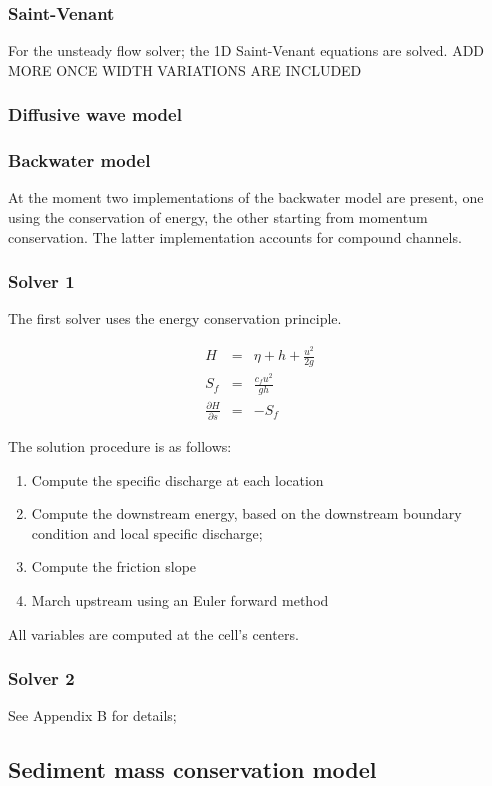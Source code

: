 \documentclass[a4paper, 11pt]{article}
\begin{document}
\subsubsection{Saint-Venant}
For the unsteady flow solver; the 1D Saint-Venant equations are solved. ADD MORE ONCE WIDTH VARIATIONS ARE INCLUDED

\subsubsection{Diffusive wave model}

\subsubsection{Backwater model}
At the moment two implementations of the backwater model are present, one using the conservation of energy, the other starting from momentum conservation. The latter implementation accounts for compound channels.
\subsubsection*{Solver 1}
 The first solver uses the energy conservation principle.

\begin{eqnarray}
H &=& \eta + h + \frac{u^2}{2g}\\
S_f &=& \frac{c_f u^2}{gh}\\
\frac{\partial H}{\partial s} &=& -S_f
\end{eqnarray}

The solution procedure is as follows:
\begin{enumerate}
\item Compute the specific discharge at each location
\item Compute the downstream energy, based on the downstream boundary condition and local specific discharge;
\item Compute the friction slope
\item March upstream using an Euler forward method
\end{enumerate}
All variables are computed at the cell's centers.

\subsubsection*{Solver 2}
See Appendix B for details;


\subsection{Sediment mass conservation model}
\end{document}
